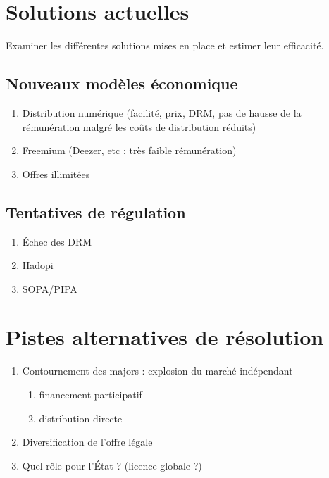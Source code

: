 \documentclass[a4paper]{report}
\begin{document}




	\chapter{Solutions actuelles}
	Examiner les différentes solutions mises en place et estimer leur efficacité.

	\section{Nouveaux modèles économique}
	\begin{enumerate}
		\item Distribution numérique (facilité, prix, DRM, pas de hausse de la rémunération malgré les coûts de distribution réduits)
		\item Freemium (Deezer, etc : très faible rémunération)
		\item Offres illimitées
	\end{enumerate}

	\section{Tentatives de régulation}
	\begin{enumerate}
		\item Échec des DRM
		\item Hadopi
		\item SOPA/PIPA
	\end{enumerate}





	\chapter{Pistes alternatives de résolution}

	\begin{enumerate}
		\item Contournement des majors : explosion du marché indépendant
		\begin{enumerate}
		 	\item financement participatif
		 	\item distribution directe
		 \end{enumerate}
		 \item Diversification de l'offre légale
		 \item Quel rôle pour l'État ? (licence globale ?)
	\end{enumerate}
\end{document}
